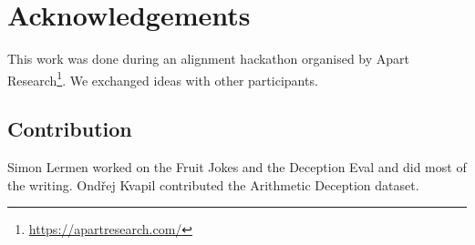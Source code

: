 \section{Acknowledgements}

This work was done during an alignment hackathon organised by Apart Research\footnote{\url{https://apartresearch.com/}}. We exchanged ideas with other participants.

\subsection{Contribution}

Simon Lermen worked on the Fruit Jokes and the Deception Eval and did most of the writing. Ondřej Kvapil contributed the Arithmetic Deception dataset.
